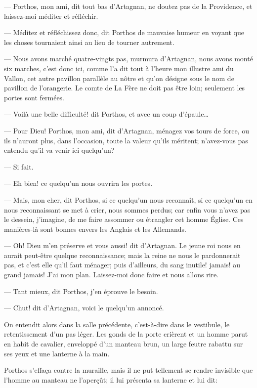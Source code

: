 — Porthos, mon ami, dit tout bas d'Artagnan, ne doutez pas de la Providence, et laissez-moi méditer et réfléchir.

— Méditez et réfléchissez donc, dit Porthos de mauvaise humeur en voyant que les choses tournaient ainsi au lieu de tourner autrement.

— Nous avons marché quatre-vingts pas, murmura d'Artagnan, nous avons monté six marches, c'est donc ici, comme l'a dit tout à l'heure mon illustre ami du Vallon, cet autre pavillon parallèle au nôtre et qu'on désigne sous le nom de pavillon de l'orangerie. Le comte de La Fère ne doit pas être loin; seulement les portes sont fermées.

— Voilà une belle difficulté! dit Porthos, et avec un coup d'épaule\dots

— Pour Dieu! Porthos, mon ami, dit d'Artagnan, ménagez vos tours de force, ou ils n'auront plus, dans l'occasion, toute la valeur qu'ils méritent; n'avez-vous pas entendu qu'il va venir ici quelqu'un?

— Si fait.

— Eh bien! ce quelqu'un nous ouvrira les portes.

— Mais, mon cher, dit Porthos, si ce quelqu'un nous reconnaît, si ce quelqu'un en nous reconnaissant se met à crier, nous sommes perdus; car enfin vous n'avez pas le dessein, j'imagine, de me faire assommer ou étrangler cet homme Église. Ces manières-là sont bonnes envers les Anglais et les Allemands.

— Oh! Dieu m'en préserve et vous aussi! dit d'Artagnan. Le jeune roi nous en aurait peut-être quelque reconnaissance; mais la reine ne nous le pardonnerait pas, et c'est elle qu'il faut ménager; puis d'ailleurs, du sang inutile! jamais! au grand jamais! J'ai mon plan. Laissez-moi donc faire et nous allons rire.

— Tant mieux, dit Porthos, j'en éprouve le besoin.

— Chut! dit d'Artagnan, voici le quelqu'un annoncé.

On entendit alors dans la salle précédente, c'est-à-dire dans le vestibule, le retentissement d'un pas léger. Les gonds de la porte crièrent et un homme parut en habit de cavalier, enveloppé d'un manteau brun, un large feutre rabattu sur ses yeux et une lanterne à la main.

Porthos s'effaça contre la muraille, mais il ne put tellement se rendre invisible que l'homme au manteau ne l'aperçût; il lui présenta sa lanterne et lui dit:

